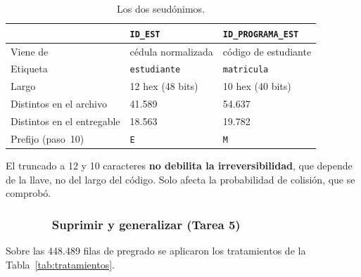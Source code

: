 \documentclass[11pt,a4paper,twoside,twocolumn]{article}
\newcommand{\cod}[1]{\nolinkurl{#1}}
\newcommand{\paso}[2]{\subsubsection*{\colorbox{ustaAzul}{\textcolor{white}{\scriptsize\sffamily\bfseries PASO #1}}\enspace #2}}
\newcommand{\cab}[1]{\textcolor{ustaAzul}{\textbf{#1}}}
\begin{document}
\begin{table}[!ht]
\centering
\caption{Los dos seudónimos.}
\label{tab:seudonimos}
\footnotesize
\begin{tabularx}{\columnwidth}{@{}P{2.3cm} L L@{}}
\toprule
 & \cab{\cod{ID_EST}} & \cab{\cod{ID_PROGRAMA_EST}} \\
\midrule
Viene de & cédula normalizada & código de estudiante \\
Etiqueta & \cod{estudiante} & \cod{matricula} \\
Largo & 12 hex (48 bits) & 10 hex (40 bits) \\
Distintos en el archivo & 41.589 & 54.637 \\
Distintos en el entregable & 18.563 & 19.782 \\
Prefijo (paso~10) & \cod{E} & \cod{M} \\
\bottomrule
\end{tabularx}
\end{table}

El truncado a 12 y 10 caracteres \textbf{no debilita la irreversibilidad}, que depende de la
llave, no del largo del código. Solo afecta la probabilidad de colisión, que se comprobó.

\paso{5}{Suprimir y generalizar (Tarea 5)}

Sobre las 448.489 filas de pregrado se aplicaron los tratamientos de la
Tabla~\ref{tab:tratamientos}.
\end{document}
